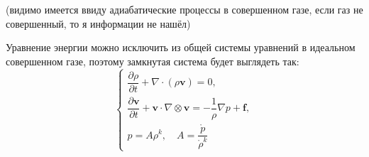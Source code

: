 
(видимо имеется ввиду адиабатические процессы в совершенном газе, если газ не совершенный,
то я информации не нашёл)


Уравнение энергии можно исключить из общей системы уравнений в идеальном совершенном газе,
поэтому замкнутая система будет выглядеть так:
\[
  \begin{cases}
    \dfrac{\partial \rho}{\partial t} + \nabla \cdot (\rho \mathbf{v}) = 0, \\
    \dfrac{\partial \mathbf{v}}{\partial t} + \mathbf{v} \cdot \nabla \otimes \mathbf{v} = - \dfrac{1}{\rho} \nabla p + \mathbf{f}, \\
    p = A \rho^k, \quad A = \dfrac{\mathring{p}}{\mathring{\rho}^k}
  \end{cases}
\]
